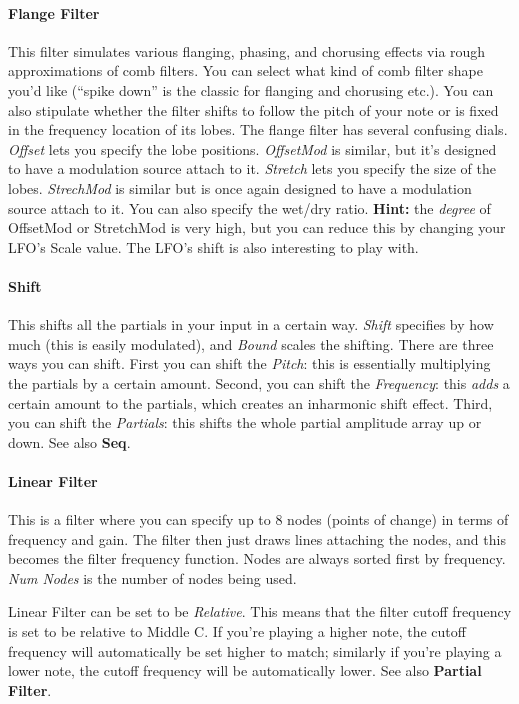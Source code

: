 \documentclass{article}
\begin{document}
\paragraph{Flange Filter} This filter simulates various flanging, phasing, and chorusing effects via rough approximations of comb filters.  You can select what kind of comb filter shape you'd like (``spike down'' is the classic for flanging and chorusing etc.).    You can also stipulate whether the filter shifts to follow the pitch of your note or is fixed in the frequency location of its lobes.    The flange filter has several confusing dials.  {\it Offset} lets you specify the lobe positions.  {\it OffsetMod} is similar, but it's designed to have a modulation source attach to it.  {\it Stretch} lets you specify the size of the lobes.  {\it StrechMod} is similar but is once again designed to have a modulation source attach to it.  You can also specify the wet/dry ratio. {\bf Hint:}  the {\it degree} of OffsetMod or StretchMod is very high, but you can reduce this by changing your LFO's Scale value.  The LFO's shift is also interesting to play with.

\paragraph{Shift} This shifts all the partials in your input in a certain way.  {\it Shift} specifies by how much (this is easily modulated), and {\it Bound} scales the shifting.  There are three ways you can shift.  First you can shift the {\it Pitch}: this is essentially multiplying the partials by a certain amount.  Second, you can shift the {\it Frequency}: this {\it adds} a certain amount to the partials, which creates an inharmonic shift effect.  Third, you can shift the {\it Partials}: this shifts the whole partial amplitude array up or down.  See also {\bf Seq}.

\paragraph{Linear Filter} This is a filter where you can specify up to 8 nodes (points of change) in terms of frequency and gain.  The filter then just draws lines attaching the nodes, and this becomes the filter frequency function.  Nodes are always sorted first by frequency.  {\it Num Nodes} is the number of nodes being used.

Linear Filter can be set to be {\it Relative}.  This means that the filter cutoff frequency is set to be relative to Middle C.  If you're playing a higher note, the cutoff frequency will automatically be set higher to match; similarly if you're playing a lower note, the cutoff frequency will be automatically lower.  See also {\bf Partial Filter}.
\end{document}
